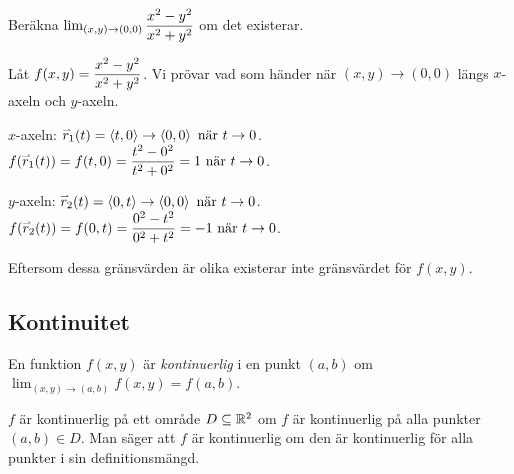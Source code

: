 \documentclass[a4paper]{article}
\begin{document}
\begin{ex}
    Beräkna \(
        \lim_{(x,y) \to (0,0)} \displaystyle\frac{x^2-y^2}{x^2+y^2} 
    \) om det existerar.

    Låt \(
        f(x,y) = \displaystyle\frac{x^2-y^2}{x^2+y^2}
    \). Vi prövar vad som händer när \(
        (x,y) \to (0,0)
    \) längs \(
        x
    \)-axeln och \(
        y
    \)-axeln.

    \(
        x
    \)-axeln: \(
        \accentset{\rightharpoonup}{r}_1 (t) = \left\langle t, 0\right\rangle \to \left\langle 0, 0\right\rangle \text{ när } t \to 0
    \). \(
        f(\accentset{\rightharpoonup}{r}_1(t) ) = f(t,0) = \displaystyle\frac{t^2-0^2}{t^2+0^2} = 1 \text{ när } t \to 0
    \).

    \(
        y
    \)-axeln: \(
        \accentset{\rightharpoonup}{r}_2 (t) = \left\langle  0, t \right\rangle \to \left\langle 0, 0\right\rangle \text{ när } t \to 0
    \). \(
        f(\accentset{\rightharpoonup}{r}_2(t) ) = f(0,t) = \displaystyle\frac{0^2-t^2}{0^2+t^2} = -1 \text{ när } t \to 0
    \). 

    Eftersom dessa gränsvärden är olika existerar inte gränsvärdet 
    för \(
        f(x,y)
    \).
\end{ex}

\subsection{Kontinuitet}
\begin{defn}
    En funktion \(
        f(x,y)
    \) är \emph{kontinuerlig} i en punkt \(
        (a,b)
    \) om \(
        \lim_{(x,y) \to (a,b)} f(x,y) = f(a,b)
    \).
\end{defn}

\begin{defn}
    \(
        f
    \) är kontinuerlig på ett område \(
        D \subseteq \mathbb{R}^2
    \) om \(
        f
    \) är kontinuerlig på alla punkter \(
        (a,b) \in D
    \). Man säger att \(
        f
    \) är kontinuerlig om den är kontinuerlig för alla punkter i
    sin definitionsmängd.
\end{defn}
\end{document}

